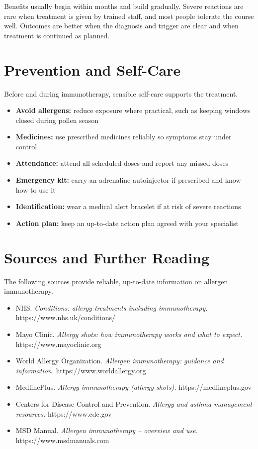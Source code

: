 Benefits usually begin within months and build gradually. Severe reactions are rare when treatment is given by trained staff, and most people tolerate the course well. Outcomes are better when the diagnosis and trigger are clear and when treatment is continued as planned.

\section*{Prevention and Self-Care}
Before and during immunotherapy, sensible self-care supports the treatment.

\begin{itemize}
    \item \textbf{Avoid allergens:} reduce exposure where practical, such as keeping windows closed during pollen season
    \item \textbf{Medicines:} use prescribed medicines reliably so symptoms stay under control
    \item \textbf{Attendance:} attend all scheduled doses and report any missed doses
    \item \textbf{Emergency kit:} carry an adrenaline autoinjector if prescribed and know how to use it
    \item \textbf{Identification:} wear a medical alert bracelet if at risk of severe reactions
    \item \textbf{Action plan:} keep an up-to-date action plan agreed with your specialist
\end{itemize}

\section*{Sources and Further Reading}
The following sources provide reliable, up-to-date information on allergen immunotherapy.

\begin{itemize}
    \item NHS. \textit{Conditions: allergy treatments including immunotherapy.} https://www.nhs.uk/conditions/
    \item Mayo Clinic. \textit{Allergy shots: how immunotherapy works and what to expect.} https://www.mayoclinic.org
    \item World Allergy Organization. \textit{Allergen immunotherapy: guidance and information.} https://www.worldallergy.org
    \item MedlinePlus. \textit{Allergy immunotherapy (allergy shots).} https://medlineplus.gov
    \item Centers for Disease Control and Prevention. \textit{Allergy and asthma management resources.} https://www.cdc.gov
    \item MSD Manual. \textit{Allergen immunotherapy -- overview and use.} https://www.msdmanuals.com
\end{itemize}

